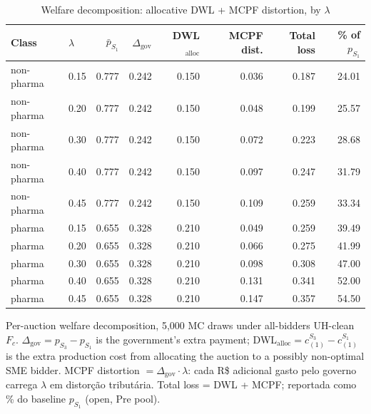 \begin{table}[htbp]
\centering
\begin{threeparttable}
\caption{Welfare decomposition: allocative DWL + MCPF distortion, by $\lambda$}
\label{tab:v3_welfare}
\small
\begin{tabular}{llrrrrrr}
\toprule
Class & $\lambda$ & $\bar p_{S_1}$ & $\Delta_{\text{gov}}$ & DWL$_{\text{alloc}}$ & MCPF dist. & Total loss & \% of $p_{S_1}$ \\
\midrule
non-pharma & 0.15 & 0.777 & 0.242 & 0.150 & 0.036 & 0.187 & 24.01 \\
non-pharma & 0.20 & 0.777 & 0.242 & 0.150 & 0.048 & 0.199 & 25.57 \\
non-pharma & 0.30 & 0.777 & 0.242 & 0.150 & 0.072 & 0.223 & 28.68 \\
non-pharma & 0.40 & 0.777 & 0.242 & 0.150 & 0.097 & 0.247 & 31.79 \\
non-pharma & 0.45 & 0.777 & 0.242 & 0.150 & 0.109 & 0.259 & 33.34 \\
pharma & 0.15 & 0.655 & 0.328 & 0.210 & 0.049 & 0.259 & 39.49 \\
pharma & 0.20 & 0.655 & 0.328 & 0.210 & 0.066 & 0.275 & 41.99 \\
pharma & 0.30 & 0.655 & 0.328 & 0.210 & 0.098 & 0.308 & 47.00 \\
pharma & 0.40 & 0.655 & 0.328 & 0.210 & 0.131 & 0.341 & 52.00 \\
pharma & 0.45 & 0.655 & 0.328 & 0.210 & 0.147 & 0.357 & 54.50 \\
\bottomrule
\end{tabular}
\begin{tablenotes}\footnotesize
\item Per-auction welfare decomposition, 5{,}000 MC draws under
all-bidders UH-clean $F_c$. $\Delta_{\text{gov}} = p_{S_3} -
p_{S_1}$ is the government's extra payment; DWL$_{\text{alloc}}
= c_{(1)}^{S_3} - c_{(1)}^{S_1}$ is the extra production cost
from allocating the auction to a possibly non-optimal SME bidder.
MCPF distortion $= \Delta_{\text{gov}} \cdot \lambda$: cada R\$
adicional gasto pelo governo carrega $\lambda$ em distor\c{c}\~ao
tribut\'aria. Total loss = DWL + MCPF; reportada como \% do
baseline $p_{S_1}$ (open, Pre pool).
\end{tablenotes}
\end{threeparttable}
\end{table}
